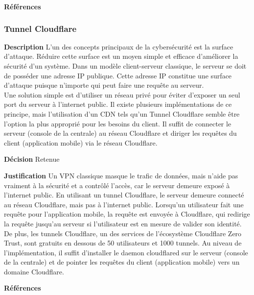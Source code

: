 \noindent\textbf{Références} 
\cite{AES2561}
\cite{AES2562}
\cite{AES2563}

\subsubsection{Tunnel Cloudflare}
\label{sec:tunne}
\noindent\textbf{Description} L’un des concepts principaux de la cybersécurité est la surface d’attaque. Réduire cette surface est un moyen simple et efficace d’améliorer la sécurité d’un système. Dans un modèle client-serveur classique, le serveur se doit de posséder une adresse IP publique. Cette adresse IP constitue une surface d’attaque puisque n’importe qui peut faire une requête au serveur. 
\\

Une solution simple est d’utiliser un réseau privé pour éviter d’exposer un seul port du serveur à l’internet public. Il existe plusieurs implémentations de ce principe, mais l’utilisation d’un CDN tels qu’un Tunnel Cloudflare semble être l’option la plus approprié pour les besoins du client. Il suffit de connecter le serveur (console de la centrale) au réseau Cloudflare et diriger les requêtes du client (application mobile) via le réseau Cloudflare.
\smallskip

\noindent\textbf{Décision} Retenue
\smallskip

\noindent\textbf{Justification} Un VPN classique masque le trafic de données, mais n’aide pas vraiment à la sécurité et a contrôlé l’accès, car le serveur demeure exposé à l’internet public. En utilisant un tunnel Cloudflare, le serveur demeure connecté au réseau Cloudflare, mais pas à l’internet public. Lorsqu’un utilisateur fait une requête pour l’application mobile, la requête est envoyée à Cloudflare, qui redirige la requête jusqu’au serveur si l’utilisateur est en mesure de valider son identité. 
\\

De plus, les tunnels Cloudflare, un des services de l’écosystème Cloudflare Zero Trust, sont gratuits en dessous de 50 utilisateurs et 1000 tunnels. Au niveau de l’implémentation, il suffit d’installer le daemon cloudflared sur le serveur (console de la centrale) et de pointer les requêtes du client (application mobile) vers un domaine Cloudflare.
\smallskip

\noindent\textbf{Références} 
\cite{Cloudflare1}
\cite{Cloudflare2}
\cite{Cloudflare3}

